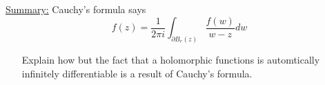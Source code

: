 \documentclass{article}
\begin{document}
\vskip 0.5cm
\begin{dottedbox}
  \underline{Summary:} Cauchy's formula says 
  \[ f(z) = \frac{1}{2 \pi i} \int_{\partial B_r(z)} \frac{f(w)}{w-z} dw \]

  \begin{itemize}
    \item [Explain how but] the fact that a holomorphic functions is automtically infinitely differentiable is a result of Cauchy's formula.
  \end{itemize}
\end{dottedbox}

\vskip 0.5cm
\end{document}
